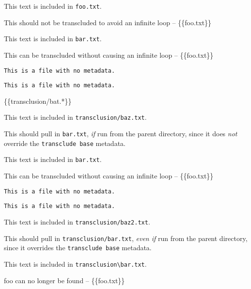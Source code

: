 
\def\mytitle{Transclusion}


This text is included in \texttt{foo.txt}.

This should not be transcluded to avoid an infinite loop -- \{\{foo.txt\}\}

This text is included in \texttt{bar.txt}.

This can be transcluded without causing an infinite loop -- \{\{foo.txt\}\}

\begin{verbatim}
This is a file with no metadata.
\end{verbatim}

\begin{verbatim}
This is a file with no metadata.
\end{verbatim}

\{\{transclusion\slash bat.*\}\}

This text is included in \texttt{transclusion\slash baz.txt}.

This should pull in \texttt{bar.txt}, \emph{if} run from the parent directory, since it
does \emph{not} override the \texttt{transclude base} metadata.

This text is included in \texttt{bar.txt}.

This can be transcluded without causing an infinite loop -- \{\{foo.txt\}\}

\begin{verbatim}
This is a file with no metadata.
\end{verbatim}

\begin{verbatim}
This is a file with no metadata.
\end{verbatim}

This text is included in \texttt{transclusion\slash baz2.txt}.

This should pull in \texttt{transclusion\slash bar.txt}, \emph{even if} run from the parent
directory, since it overrides the \texttt{transclude base} metadata.

This text is included in \texttt{transclusion\textbackslash{}bar.txt}.

foo can no longer be found -- \{\{foo.txt\}\}



